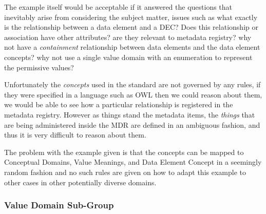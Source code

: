 \documentclass{article}
\begin{document}
The example itself would be acceptable if it answered the questions that inevitably arise from considering the subject matter, issues such as what exactly is the relationship between a data element and a DEC? Does this relationship or association have other attributes? are they relevant to metadata registry? why not have a \emph{containment} relationship between data elements and the data element concepts? why not use a single value domain with an enumeration to represent the permissive values? 

Unfortunately the \emph{concepts} used in the standard are not governed by any rules, if they were specified in a language such as OWL then we could reason about them, we would be able to see how a particular relationship is registered in the metadata registry. However as things stand the metadata items, the \emph{things} that are being administered inside the MDR are defined in an ambiguous fashion, and thus it is very difficult to reason about them.

The problem with the example given is that the concepts can be mapped to Conceptual Domains, Value Meanings, and Data Element Concept in a seemingly random fashion and no such rules are given on how to adapt this example to other cases in other potentially diverse domains.




\subsubsection{Value Domain Sub-Group}
\end{document}
